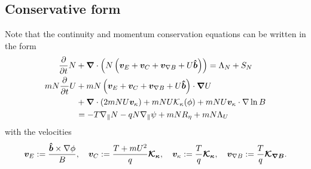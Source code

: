 \subsection{Conservative form}
Note that the continuity and momentum conservation equations can be
written in the form
\begin{align}
\frac{\partial}{\partial t} N &+ {\boldsymbol{\nabla}}\cdot\left( N \left(
    {\boldsymbol{v}}_E + {\boldsymbol{v}}_C + {\boldsymbol{v}}_{\nabla B} + U\bm{\hat{b}}\right)\right) = \Lambda_N + S_N \\
mN \frac{\partial}{\partial t} U &+ mN \left(
    {\boldsymbol{v}}_E + {\boldsymbol{v}}_C + {\boldsymbol{v}}_{\nabla B} + U\bm{\hat{b}}
    \right)\cdot {\boldsymbol{\nabla}} U  \nonumber \\
    &+ {\boldsymbol{\nabla}} \cdot ( 2mNU {\boldsymbol{v}}_\kappa)
    + mNU\mathcal K_\kappa(\phi)
    + mNU{\boldsymbol{v}}_\kappa \cdot \nabla \ln B \nonumber\\
    &= -T \nabla_\parallel N -qN\nabla_\parallel \psi + mN R_\eta + mN\Lambda_U
\label{}
\end{align}
with the velocities
\begin{align}
{\boldsymbol{v}}_E := \frac{\bm{\hat{b}}\times\nabla\phi}{B},\quad
{\boldsymbol{v}}_C := \frac{T+mU^2}{q}{\boldsymbol{\mathcal K_\kappa}},\quad
{\boldsymbol{v}}_\kappa := \frac{T}{q}{\boldsymbol{\mathcal K_\kappa}},\quad
{\boldsymbol{v}}_{\nabla B} := \frac{T}{q}{\boldsymbol{\mathcal K_{\nabla B}}}.
\label{}
\end{align}
